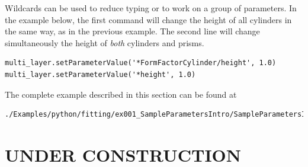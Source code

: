 Wildcards  can be used to reduce typing or to work on a group
of parameters. In the example below, the first command will change the
height of all cylinders in the same way, as in the previous example. The second line will change simultaneously the height of {\it both} cylinders and prisms.
\begin{lstlisting}[language=shell, style=commandline]
multi_layer.setParameterValue('*FormFactorCylinder/height', 1.0)
multi_layer.setParameterValue('*height', 1.0)
\end{lstlisting}

The complete example described in this section can be found at
\begin{lstlisting}[language=shell, style=commandline]
./Examples/python/fitting/ex001_SampleParametersIntro/SampleParametersIntro.py
\end{lstlisting}

\section{UNDER CONSTRUCTION}


